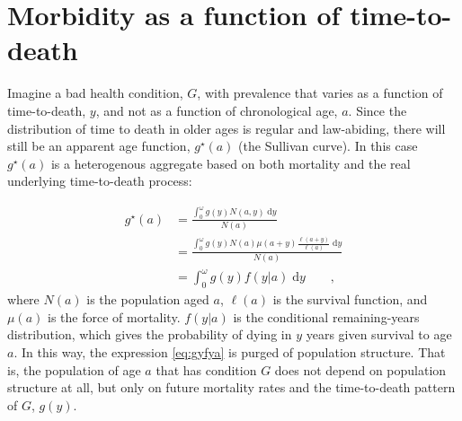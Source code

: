 \documentclass[11pt,oneside,a4paper]{article} %
\newcommand{\dd}{\; \mathrm{d}}
\newcommand{\tc}{\quad\quad\text{,}}
\begin{document}



\section{Morbidity as a function of time-to-death}
 
Imagine a bad health condition, $G$, with prevalence that varies as a
function of time-to-death, $y$, and not as a function of chronological age, $a$.
Since the distribution of time to death in older ages is regular and law-abiding, there will still be an
apparent age function, $g^\star(a)$ (the Sullivan curve).
In this case $g^\star(a)$ is a heterogenous aggregate based on both mortality
and the real underlying time-to-death process:
 
\begin{align}
g^\star(a) &= \frac{\int _0^\omega g(y) N(a,y) \dd y}{N(a)} \\
      &= \frac{\int _0^\omega g(y) N(a)
      \mu(a+y)\frac{\ell(a+y)}{\ell(a)}\dd y}{N(a)}\\
      &= \int _0^\omega g(y) f(y|a)\dd y \label{eq:gyfya}\tc
\end{align}
where $N(a)$ is the population aged $a$, $\ell(a)$ is the survival function, and
$\mu(a)$ is the force of mortality. $f(y|a)$ is the conditional remaining-years
distribution, which gives the probability of dying in $y$ years given survival
to age $a$. In this way, the expression \eqref{eq:gyfya} is purged of population
structure.
That is, the population of age $a$ that has condition $G$ does not depend on population structure at all, but only
on future mortality rates and the time-to-death pattern of $G$, $g(y)$. 
\end{document}
